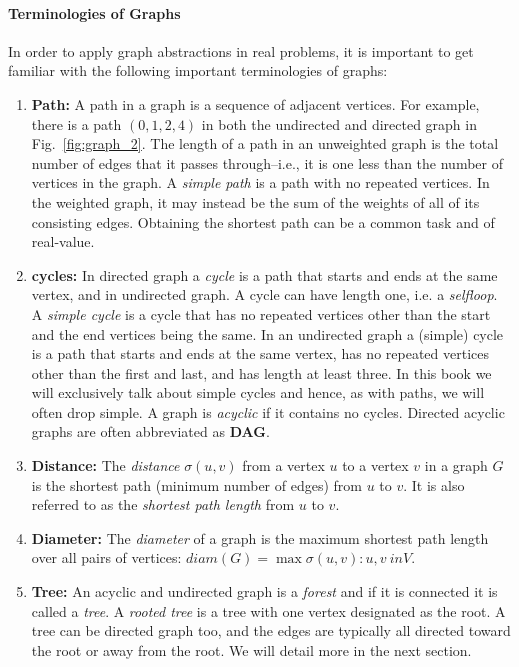 \documentclass[../main.tex]{subfiles}
\begin{document}
\paragraph{Terminologies of Graphs}  In order to apply graph abstractions in real problems, it is important to get familiar with the following important terminologies of graphs: 
\begin{enumerate}
    \item \textbf{Path:} A path in a graph is a sequence of adjacent vertices. For example, there is a path $(0, 1, 2, 4)$ in both the undirected and directed graph in Fig.~\ref{fig:graph_2}.  The length of a path in an unweighted graph is the total number of edges that it passes through--i.e., it is one less than the number of vertices in the graph. A \textit{simple path} is a path with no repeated vertices. In the weighted graph, it may instead be the sum of the weights of all of its consisting edges. Obtaining the shortest path can be a common task and of real-value. 
    \item \textbf{cycles:} In directed graph a \textit{cycle} is a path that starts and ends at the same vertex, and in undirected graph. A cycle can have length one, i.e. a \textit{selfloop}. A \textit{simple cycle} is a cycle that has no repeated vertices other than the start and the end vertices being the same.   In an undirected graph a (simple) cycle is a path that starts and ends at the same vertex, has no repeated vertices other than the first and last, and
has length at least three. In this book we will exclusively talk about simple cycles and hence, as
with paths, we will often drop simple. A graph is \textit{acyclic} if it contains no cycles. Directed acyclic graphs are often abbreviated as \textbf{DAG}.
\item \textbf{Distance:} The \textit{distance} $\sigma(u, v)$ from a vertex $u$ to a vertex $v$ in a graph $G$ is the shortest path (minimum number of edges) from $u$ to $v$. It is also referred to as the \textit{shortest path length} from $u$ to $v$. 
\item \textbf{Diameter:} The \textit{diameter} of a graph is the maximum shortest path length over all pairs of vertices: $diam(G) = \max{\sigma(u, v): u, v \ in V}$.
    \item \textbf{Tree:} An acyclic and undirected graph is a \textit{forest} and if it is connected it is called a \textit{tree}. A \textit{rooted tree} is a tree with one vertex designated as the root. A tree can be directed graph too, and the edges are typically all directed toward the root or away from the root.  We  will detail more in the next section.

\end{enumerate}
\end{document}
